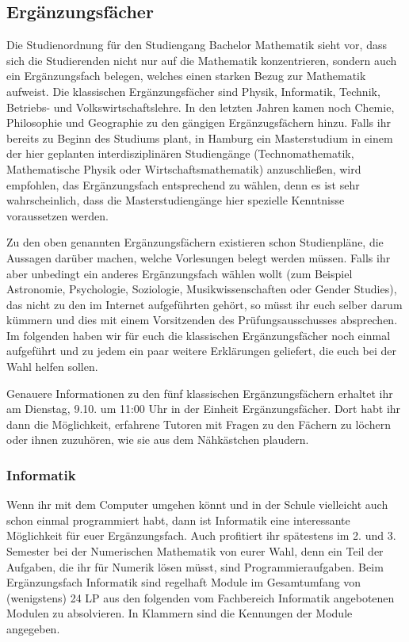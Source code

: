 
\subsection{Ergänzungsfächer} \label{page:erg}

Die Studienordnung für den Studiengang Bachelor Mathematik sieht vor, dass sich
die Studierenden nicht nur auf die Mathematik konzentrieren, sondern auch ein
Ergänzungsfach belegen, welches einen starken Bezug zur Mathematik aufweist.
Die klassischen Ergänzungsfächer sind Physik, Informatik, Technik, Betriebs-
und Volkswirtschaftslehre. In den letzten Jahren kamen noch Chemie, Philosophie
und Geographie zu den gängigen Ergänzugsfächern hinzu. Falls ihr bereits zu
Beginn des Studiums plant, in Hamburg ein Masterstudium in einem der hier
geplanten interdisziplinären Studiengänge (Technomathematik, Mathematische
Physik oder Wirtschaftsmathematik) anzuschließen, wird empfohlen, das
Ergänzungsfach entsprechend zu wählen, denn es ist sehr wahrscheinlich, dass
die Masterstudiengänge hier spezielle Kenntnisse voraussetzen werden.

Zu den oben genannten Ergänzungsfächern existieren schon Studienpläne, die
Aussagen darüber machen, welche Vorlesungen belegt werden müssen. Falls ihr
aber unbedingt ein anderes Ergänzungsfach wählen wollt (zum Beispiel
Astronomie, Psychologie, Soziologie, Musikwissenschaften oder Gender Studies),
das nicht zu den im Internet aufgeführten gehört, so müsst ihr euch selber
darum kümmern und dies mit einem Vorsitzenden des Prüfungsausschusses
absprechen. Im folgenden haben wir für euch die klassischen Ergänzungsfächer
noch einmal aufgeführt und zu jedem ein paar weitere Erklärungen geliefert, die
euch bei der Wahl helfen sollen.

Genauere Informationen zu den fünf klassischen Ergänzungsfächern erhaltet ihr
am Dienstag, 9.10. um 11:00 Uhr in der Einheit Ergänzungsfächer. Dort habt ihr
dann die Möglichkeit, erfahrene Tutoren mit Fragen zu den Fächern zu löchern
oder ihnen zuzuhören, wie sie aus dem Nähkästchen plaudern.

\subsubsection{Informatik}

Wenn ihr mit dem Computer umgehen könnt und in der Schule vielleicht auch schon
einmal programmiert habt, dann ist Informatik eine interessante Möglichkeit für
euer Ergänzungsfach. Auch profitiert ihr spätestens im 2. und 3.  Semester bei
der Numerischen Mathematik von eurer Wahl, denn ein Teil der Aufgaben, die ihr
für Numerik lösen müsst, sind Programmieraufgaben. Beim Ergänzungsfach
Informatik sind regelhaft Module im Gesamtumfang von (wenigstens) 24 LP aus den
folgenden vom Fachbereich Informatik angebotenen Modulen zu absolvieren. In
Klammern sind die Kennungen der Module angegeben.

